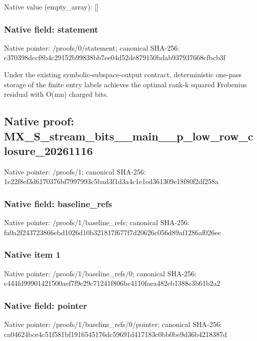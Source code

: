 \documentclass[10pt,a4paper]{article}
\begin{document}
Native value (empty\_\allowbreak{}array): []

\subsubsection{Native field: statement}
Native pointer: /proofs/0/statement; canonical SHA-256: c370398dccf8b4c29152b99838bb7ee04d52de879150bdab937937668cfbcb3f

\begingroup\raggedright\sloppy Under the existing symbolic-subspace-output contract,\allowbreak{} deterministic one-pass storage of the finite entry labels achieves the optimal rank-k squared Frobenius residual with O(mn) charged bits.\par\endgroup

\subsection{Native proof: MX\_\allowbreak{}S\_\allowbreak{}stream\_\allowbreak{}bits\_\allowbreak{}\_\allowbreak{}main\_\allowbreak{}\_\allowbreak{}p\_\allowbreak{}low\_\allowbreak{}row\_\allowbreak{}closure\_\allowbreak{}20261116}
Native pointer: /proofs/1; canonical SHA-256: 1e22f8ef3d6170376bf7997993c5bad3f1d3a4c1e1ed361309e18f80f2df258a

\subsubsection{Native field: baseline\_\allowbreak{}refs}
Native pointer: /proofs/1/baseline\_\allowbreak{}refs; canonical SHA-256: fa0a2f243723866ebd1026d10b321817f677f7d20626c056d89af1286af026ee

\subsubsection{Native item 1}
Native pointer: /proofs/1/baseline\_\allowbreak{}refs/0; canonical SHA-256: c444fd99901421500aef7f9e29c71241f806bc4110faea482eb1388c3b61b2a2

\subsubsection{Native field: pointer}
Native pointer: /proofs/1/baseline\_\allowbreak{}refs/0/pointer; canonical SHA-256: ca04624bce4c51f581bf1916545176dc59691d417183c0bb0be9d36b4218387d
\end{document}
